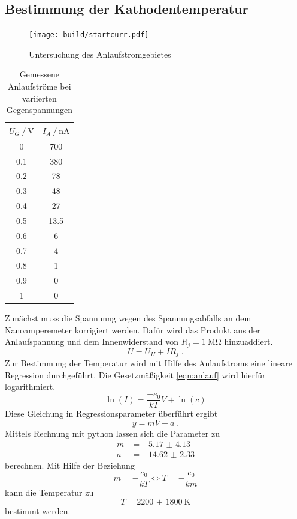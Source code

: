 \subsection{Bestimmung der Kathodentemperatur}
\begin{figure}
    \centering
    \caption{Untersuchung des Anlaufstromgebietes}
    \label{fig:startcurr}
    \texttt{[image: build/startcurr.pdf]}
\end{figure}
\begin{table}
    \centering
    \caption{Gemessene Anlaufströme bei variierten Gegenspannungen}
    \label{tab:anlauf}
    \begin{tabular}{S[table-format = 1.1] S[table-format = 3.1]}
        \toprule
        {$U_G \mathbin{/} \si{\volt}$} & {$I_A \mathbin{/} \si{\nano\ampere}$} \\
           & 700   \\
        0.1 & 380   \\
        0.2 & 78    \\
        0.3 & 48    \\
        0.4 & 27    \\
        0.5 & 13.5  \\
        0.6 & 6     \\
        0.7 & 4     \\
        0.8 & 1     \\
        0.9 & 0     \\
        1   & 0     \\
        \bottomrule
    \end{tabular}
\end{table}
\noindent Zunächst muss die Spannunng wegen des Spannungsabfalls an dem Nanoamperemeter korrigiert werden.
Dafür wird das Produkt aus der Anlaufspannung und dem Innenwiderstand von $R_j = \SI{1}{\mega\ohm}$ hinzuaddiert.
\begin{equation}
    U = U_H + I R_j \; \text{.} \label{eqn:Korrektur}
\end{equation}
Zur Bestimmung der Temperatur wird mit Hilfe des Anlaufstroms eine lineare Regression durchgeführt. 
Die Gesetzmäßigkeit \eqref{eqn:anlauf} wird hierfür logarithmiert.
\begin{equation}
    \ln \left ( I \right ) = \frac{-e_0}{kT} V + \ln \left (c \right )
\end{equation}
Diese Gleichung in Regressionsparameter überführt ergibt
\begin{equation}
    y = mV + a \; \text{.}
\end{equation}
Mittels Rechnung mit python lassen sich die Parameter zu 
\begin{align*}
    m &= \num{-5.17(413)} \\
    a &= \num{-14.62(233)}
\end{align*}
berechnen.
Mit Hilfe der Beziehung 
\begin{equation}
    m = -\frac{e_0}{kT} \iff T = -\frac{e_0}{km}
\end{equation}
kann die Temperatur zu 
\begin{equation*}
    T = \SI{2200(1800)}{\kelvin} 
\end{equation*}
bestimmt werden.
